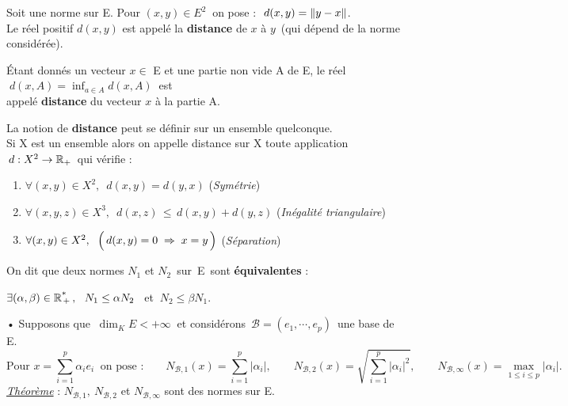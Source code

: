 Soit \normtxt{\ } une norme sur E. Pour \((x,y)\in E^2 \ \) on pose : \(\ d(x,y)=\left\lVert y-x\right\rVert \). \\
Le réel positif \(d(x,y)\) est appelé la \textbf{distance} de \(x\) à \(y\,\) (qui dépend de la norme considérée).

\newpage

Étant donnés un vecteur \(x\in\) E et une partie non vide A de E, le réel \(\;\displaystyle d(x,A)=\inf _{a\in A} d(x,A)\ \) est\vspace{-0.1cm} \\
appelé \textbf{distance} du vecteur \(x\) à la partie A.

\vspace{1.5cm}

La notion de \textbf{distance} peut se définir sur un ensemble quelconque.\\
Si X est un ensemble alors on appelle distance sur X toute application \(\,d:X^2 \to \mathbb{R}_+\,\) qui vérifie : 
\begin{enumerate}[leftmargin=2cm]
    \item \(\forall(x,y)\in X^2,\ \; d(x,y)=d(y,x)\) \hspace{3.2cm} (\emph{Symétrie})
    
    \item \(\forall (x,y,z)\in X^3,\ \; d(x,z)\,\leq \,d(x,y)+d(y,z)\) \hspace{1cm} (\emph{Inégalité triangulaire})
    
    \item \(\forall (x,y)\in X^2,\ \; \Bigl(\,d(x,y)=0\; \Rightarrow\; x=y\,\Bigr)\) \hspace{1.65cm} (\emph{Séparation})
\end{enumerate}

\vspace{1.5cm}

On dit que deux normes \(N_1\) et \(N_2\,\) sur\, E\, sont \textbf{équivalentes} \ssi :\vspace{-0.15cm}
\begin{center}
    \( \exists (\alpha, \beta) \in \mathbb{R}\textsuperscript{*}\!\!_+\,,\ \ N_1\leq \alpha N_2 \ \,\) et \(\ N_2\leq \beta N_1\).
\end{center}

\vspace{1.4cm}

• Supposons que \(\ \dim_KE< +\infty \ \) et considérons \(\,\mathcal{B} = (e_{1}, \cdots, e_{p})\,\) une base de E.\vspace{-0.2cm}
\[\text{Pour } x=\sum_{i=1}^p \alpha_ie_i \ \text{ on pose :} \qquad N_{\mathcal{B},1}(x) =\sum_{i=1}^p |\alpha_i|, \qquad  N_{\mathcal{B},2}(x) =\sqrt{\sum_{i=1}^p |\alpha_i|^2}, \qquad  N_{\mathcal{B},\infty}(x) =\max _{1\leq i\leq p} |\alpha_i|. \]
\underline{\emph{Théorème}} : \(N_{\mathcal{B},1},\ N_{\mathcal{B},2}\) et \(N_{\mathcal{B},\infty}\) sont des normes sur E.

